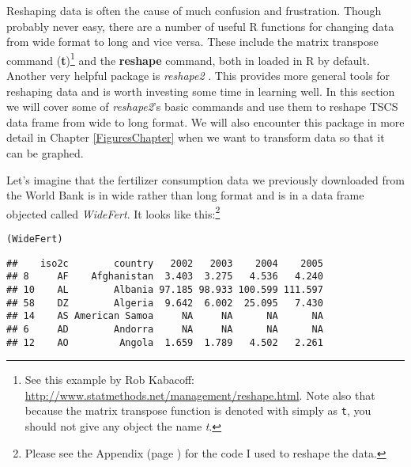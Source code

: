 Reshaping data is often the cause of much confusion and frustration. Though probably never easy, there are a number of useful R functions for changing data from wide format to long and vice versa. These include the matrix transpose command (\textbf{t})\footnote{See this example by Rob Kabacoff: \url{http://www.statmethods.net/management/reshape.html}. Note also that because the matrix transpose function is denoted with simply as \texttt{t}, you should not give any object the name \emph{t}.} and the \textbf{reshape} command, both in loaded in R by default.  Another very helpful package is \emph{reshape2} \citep{R-reshape2}. This provides more general tools for reshaping data and is worth investing some time in learning well. In this section we will cover some of \emph{reshape2}'s basic commands and use them to reshape TSCS data frame from wide to long format. We will also encounter this package in more detail in Chapter \ref{FiguresChapter} when we want to transform data so that it can be graphed.

Let's imagine that the fertilizer consumption data we previously downloaded from the World Bank is in wide rather than long format and is in a data frame objected called \emph{WideFert}. It looks like this:\footnote{Please see the Appendix (page \pageref{WideAppendix}) for the code I used to reshape the data.}




\begin{knitrout}
\color{fgcolor}\begin{kframe}
\begin{alltt}
(WideFert)
\end{alltt}
\begin{verbatim}
##    iso2c        country   2002   2003    2004    2005
## 8     AF    Afghanistan  3.403  3.275   4.536   4.240
## 10    AL        Albania 97.185 98.933 100.599 111.597
## 58    DZ        Algeria  9.642  6.002  25.095   7.430
## 14    AS American Samoa     NA     NA      NA      NA
## 6     AD        Andorra     NA     NA      NA      NA
## 12    AO         Angola  1.659  1.789   4.502   2.261
\end{verbatim}
\end{kframe}
\end{knitrout}


